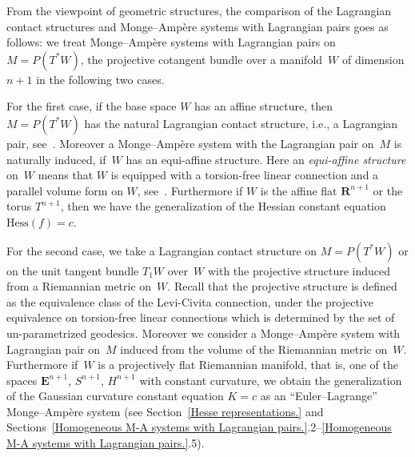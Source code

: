 \documentclass[pdftex]{sigma}
\begin{document}
From the viewpoint of geometric structures,
the comparison of the Lagrangian contact structures and Monge--Amp{\`e}re systems with Lagrangian pairs
goes as follows:
we treat Monge--Amp{\`e}re systems with
Lagrangian pairs on $M = P(T^*W)$, the projective cotangent bundle
over a manifold~$W$ of dimension $n+1$ in the following two cases.

For the f\/irst case, if the base space
$W$ has an af\/f\/ine structure, then $M = P(T^*W)$ has the natural
Lagrangian contact structure, i.e., a Lagrangian pair, see~\cite{Tak}.
Moreover a Monge--Amp{\`e}re system with the Lagrangian pair on~$M$ is
naturally induced,  if~$W$ has an equi-af\/f\/ine structure.
Here an {\it equi-affine structure} on~$W$ means that
$W$ is equipped with a torsion-free linear connection and a parallel volume
form on $W$, see~\cite{N-S}.
Furthermore if $W$ is the af\/f\/ine f\/lat
${{\mathbf{R}}}^{n+1}$ or the torus $T^{n+1}$, then we have
the generalization of the Hessian constant equation ${\mathrm{Hess}}(f) = c$.

For the second case,
we take a Lagrangian contact structure on
$M=P(T^*W)$ or on the unit tangent bundle $T_1W$ over~$W$
with the projective structure induced from a Riemannian metric on~$W$.
Recall that the projective structure is def\/ined as the equivalence class
of the Levi-Civita connection, under the projective equivalence on
torsion-free linear connections which is determined by the set of un-parametrized geodesics.
Moreover we consider a Monge--Amp{\`e}re system with Lagrangian pair on~$M$
induced from the volume of the Riemannian metric on~$W$.
Furthermore if~$W$ is a projectively f\/lat
Riemannian manifold, that is, one of the spaces
${{\mathbf{E}}}^{n+1}$, $S^{n+1}$, $H^{n+1}$ with constant curvature,
we obtain the generalization of the Gaussian curvature constant equation $K = c$
as an ``Euler--Lagrange''  Monge--Amp\`ere system (see
Section~\ref{Hesse representations.}
and Sections~\ref{Homogeneous M-A systems with Lagrangian pairs.}.2--\ref{Homogeneous M-A systems with Lagrangian pairs.}.5).
\end{document}
